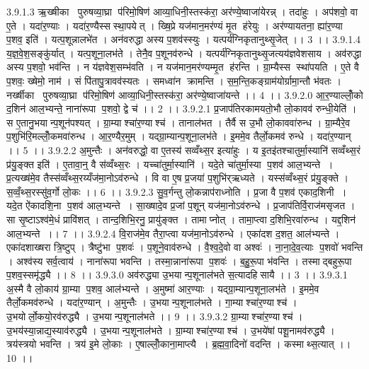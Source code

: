 3.9.1.3
ऋ॒ख्षीका पुरुषव्या॒घ्रा प॑रिमो॒षिण॑ आव्या॒धिनी॒स्तस्क॑रा॒ अर॑ण्ये॒ष्वाजा॑येरन्न् । तदा॑हुः । अप॑शवो॒ वा ए॒ते । यदा॑र॒ण्याः । यदा॑र॒ण्यैस्स॑स्था॒पयेत् । ख्षि॒प्रे यज॑मान॒मर॑ण्यं मृ॒त ह॑रेयुः । अर॑ण्यायतना॒ ह्या॑र॒ण्या प॒शव॒ इति॑ । यत्प॒शून्नालभे॑त । अन॑वरुद्धा अस्य प॒शव॑स्स्युः । यत्पर्य॑ग्निकृतानुथ्सृ॒जेत् ।। 3 ।।
3.9.1.4
य॒ज्ञ॒वे॒श॒सङ्कु॑र्यात् । यत्प॒शूना॒लभ॑ते । तेनै॒व प॒शूनव॑रुन्धे । यत्पर्य॑ग्निकृतानुथ्सृ॒जत्यय॑ज्ञवेशसाय । अव॑रुद्धा अस्य प॒शवो॒ भव॑न्ति । न य॑ज्ञवेश॒सम्भ॑वति । न यज॑मान॒मर॑ण्यम्मृ॒त ह॑रन्ति । ग्रा॒म्यैस्स स्था॑पयति । ए॒ते वै प॒शवः॒ ख्षेमो॒ नाम॑ । सं पि॑तापु॒त्रावव॑स्यतः । समध्वा॑न क्रामन्ति । स॒म॒न्ति॒कङ्ग्राम॑योर्ग्रामा॒न्तौ भ॑वतः । नर्ख्षीका पुरुषव्या॒घ्रा प॑रिमो॒षिण॑ आव्या॒धिनी॒स्तस्क॑रा॒ अर॑ण्ये॒ष्वाजा॑यन्ते ।। 4 ।।
3.9.2.0
आ॒र॒ण्याल्लोँ॒को द॒शिन॑ आल॒भ्यन्ते॒ नाना॑रूपा प॒शवो॒ द्वे च॑ ।। 2 ।।
3.9.2.1
प्र॒जाप॑तिरकामयतो॒भौ लो॒कावव॑ रुन्धी॒येति॑ । स ए॒तानु॒भयान्प॒शून॑पश्यत् । ग्रा॒म्याश्चा॑र॒ण्याश्च॑ । तानाल॑भत । तैर्वै स उ॒भौ लो॒काववा॑रुन्ध । ग्रा॒म्यैरे॒व प॒शुभि॑रि॒मल्लोँ॒कमवा॑रुन्ध । आ॒र॒ण्यैर॒मुम् । यद्ग्रा॒म्यान्प॒शूना॒लभ॑ते । इ॒ममे॒व तैर्लो॒कमव॑ रुन्धे । यदा॑र॒ण्यान् ।। 5 ।।
3.9.2.2
अ॒मुन्तैः । अन॑वरुद्धो॒ वा ए॒तस्य॑ सव्वँथ्स॒र इत्या॑हुः । य इ॒तइ॑तश्चातुर्मा॒स्यानि॑ सव्वँथ्स॒रं प्र॑यु॒ङ्क्त इति॑ । ए॒तावा॒न्॒ वै स॑व्वँथ्स॒रः । यच्चा॑तुर्मा॒स्यानि॑ । यदे॒ते चा॑तुर्मा॒स्या प॒शव॑ आल॒भ्यन्ते । प्र॒त्यख्ष॑मे॒व तैस्स॑व्वँथ्स॒रय्यँज॑मा॒नोऽव॑रुन्धे । वि वा ए॒ष प्र॒जया॑ प॒शुभि॑र्‌ऋध्यते । यस्स॑व्वँथ्स॒रं प्र॑यु॒ङ्क्ते । स॒व्वँ॒थ्स॒रस्सु॑व॒र्गो लो॒कः ।। 6 ।।
3.9.2.3
सु॒व॒र्गन्तु लो॒कन्नाप॑राध्नोति । प्र॒जा वै प॒शव॑ एकाद॒शिनी । यदे॒त ऐ॑कादशि॒ना प॒शव॑ आल॒भ्यन्ते । सा॒ख्षादे॒व प्र॒जां प॒शून् यज॑मा॒नोऽव॑रुन्धे । प्र॒जाप॑तिर्वि॒राज॑मसृजत । सा सृ॒ष्टाऽश्व॑मे॒धं प्रावि॑शत् । तान्द॒शिभि॒रनु॒ प्रायु॑ङ्क्त । तामाप्नोत् । तामा॒प्त्वा द॒शिभि॒रवा॑रुन्ध । यद्द॒शिन॑ आल॒भ्यन्ते ।। 7 ।।
3.9.2.4
वि॒राज॑मे॒व तैरा॒प्त्वा यज॑मा॒नोऽव॑रुन्धे । एका॑दश द॒शत॒ आल॑भ्यन्ते । एका॑दशाख्षरा त्रि॒ष्टुप् । त्रैष्टु॑भा प॒शवः॑ । प॒शूने॒वाव॑रुन्धे । वै॒श्व॒दे॒वो वा अश्वः॑ । ना॒ना॒दे॒व॒त्याः प॒शवो॑ भवन्ति । अश्व॑स्य सर्व॒त्वाय॑ । नाना॑रूपा भवन्ति । तस्मा॒न्नाना॑रूपा प॒शवः॑ । ब॒हु॒रू॒पा भ॑वन्ति । तस्माद्बहुरू॒पा प॒शव॒स्समृ॑द्ध्यै ।। 8 ।।
3.9.3.0
अव॑रुद्ध्या उ॒भयान्प॒शूनाल॑भते स॒त्यादहि॑सायै ।। 3 ।।
3.9.3.1
अ॒स्मै वै लो॒काय॑ ग्रा॒म्या प॒शव॒ आल॑भ्यन्ते । अ॒मुष्मा॑ आर॒ण्याः । यद्ग्रा॒म्यान्प॒शूना॒लभ॑ते । इ॒ममे॒व तैर्लो॒कमव॑रुन्धे । यदा॑र॒ण्यान् । अ॒मुन्तैः । उ॒भयान्प॒शूनाल॑भते । गा॒म्याश्चा॑र॒ण्याश्च॑ । उ॒भयोर्लो॒कयो॒रव॑रुद्ध्यै । उ॒भयान्प॒शूनाल॑भते ।। 9 ।।
3.9.3.2
ग्रा॒म्याश्चा॑र॒ण्याश्च॑ । उ॒भय॑स्या॒न्नाद्य॒स्याव॑रुद्ध्यै । उ॒भयान्प॒शूनाल॑भते । ग्रा॒म्याश्चा॑र॒ण्याश्च॑ । उ॒भये॑षां पशू॒नामव॑रुद्ध्यै । त्रय॑स्त्रयो भवन्ति । त्रय॑ इ॒मे लो॒काः । ए॒षाल्लोँ॒काना॒माप्त्यै । ब्र॒ह्म॒वा॒दिनो॑ वदन्ति । कस्माथ्स॒त्यात् ।। 10 ।।

